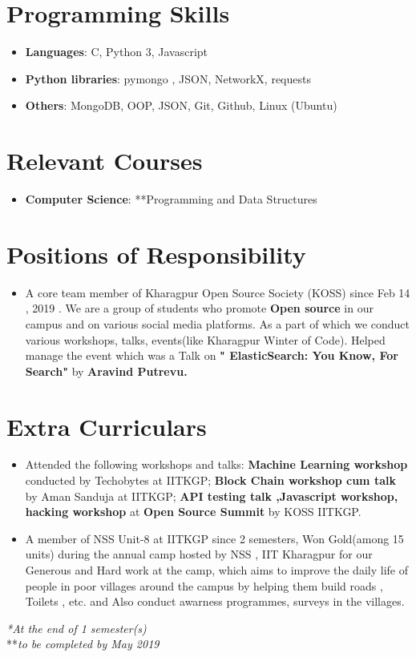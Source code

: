 \documentclass[letterpaper,11pt]{article}
\newcommand{\resumeSubHeadingListStart}{\begin{itemize}[leftmargin=*]}
\newcommand{\resumeSubHeadingListEnd}{\end{itemize}}
\begin{document}
%
\section{Programming Skills}
 \resumeSubHeadingListStart
   \item{
     \textbf{Languages}{: C, Python 3, Javascript}
     \hfill
   }
   \item{
     \textbf{Python libraries}{: pymongo , JSON, NetworkX, requests}
     \hfill
   }
   \item{
     \textbf{Others}{: MongoDB, OOP, JSON, Git, Github, Linux (Ubuntu)}
     \hfill
   }
 \resumeSubHeadingListEnd


\section{Relevant Courses}
  \resumeSubHeadingListStart
  \item{
    \textbf{Computer Science}{: **Programming and Data Structures}
    \hfill
  }
  \resumeSubHeadingListEnd
\section{Positions of Responsibility}
  \resumeSubHeadingListStart
    \item{
      {A core team member of Kharagpur Open Source Society (KOSS) since Feb 14 , 2019 . We are a group of students who promote }    \textbf{Open source}{ in our campus and on various social media platforms. As a part of which we conduct various workshops, talks, events(like Kharagpur Winter of Code). 
      Helped manage the event which  was a Talk on } \textbf{" ElasticSearch: You Know, For Search"} {by} \textbf{ Aravind Putrevu.}
      \hfill
    }
  \resumeSubHeadingListEnd
\section{Extra Curriculars}
  \resumeSubHeadingListStart
    \item{
      {Attended the following workshops and talks}{: }    \textbf{Machine Learning workshop} { conducted by Techobytes at IITKGP; }    \textbf{Block Chain workshop cum talk} { by Aman Sanduja at IITKGP; } \textbf{API testing talk ,Javascript workshop, hacking workshop }{at }\textbf{Open Source Summit} { by KOSS IITKGP.}
      \hfill
    }
    \item{
      {A member of NSS Unit-8 at IITKGP since 2 semesters, Won Gold(among 15 units) during the annual camp hosted by NSS , IIT Kharagpur for our Generous and Hard work at the camp, which aims to improve the daily life of people in poor villages around the campus by helping them build  roads , Toilets , etc. and Also conduct awarness programmes, surveys in the villages. }
      \hfill
    }

  \resumeSubHeadingListEnd
  \textit{ *At the end of 1 semester(s)}\\
  {**}\textit{to be completed by May 2019}\\
\end{document}
